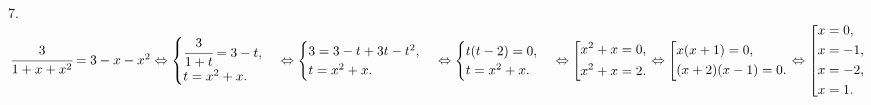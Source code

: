 7. $\cfrac{3}{1+x+x^2}=3-x-x^2 \Leftrightarrow \begin{cases}
\cfrac{3}{1+t}=3-t,\\
t=x^2+x.\end{cases}\Leftrightarrow\begin{cases}
3=3-t+3t-t^2,\\
t=x^2+x.\end{cases}\Leftrightarrow\begin{cases}
t(t-2)=0,\\
t=x^2+x.\end{cases}\Leftrightarrow \left[
\begin{gathered}
x^2+x=0, \hfill
\\
x^2+x=2. \hfill
\\
\end{gathered}
\right.\Leftrightarrow \left[
\begin{gathered}
x(x+1)=0, \hfill
\\
(x+2)(x-1)=0. \hfill
\\
\end{gathered}
\right.\Leftrightarrow \left[
\begin{gathered}
x=0, \hfill
\\
x=-1, \hfill
\\
x=-2, \hfill
\\
x=1. \hfill
\end{gathered}
\right.\hfill$\\
